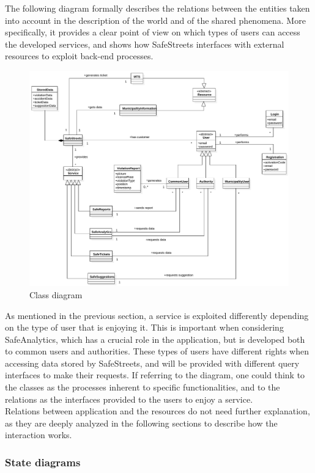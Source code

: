 \documentclass[a4paper]{article}
\begin{document}
The following diagram formally describes the relations between the
entities taken into account in the description of the world and of the
shared phenomena. More specifically, it provides a clear point of view
on which types of users can access the developed services, and shows how
SafeStreets interfaces with external resources to exploit back-end
processes.

\begin{figure}[H]
\centering
\includegraphics[width=\textwidth]{class_diagram}
\caption{Class diagram}
\end{figure}

As mentioned in the previous section, a service is exploited differently
depending on the type of user that is enjoying it. This is important
when considering SafeAnalytics, which has a crucial role in the
application, but is developed both to common users and authorities.
These types of users have different rights when accessing data stored by
SafeStreets, and will be provided with different query interfaces to
make their requests. If referring to the diagram, one could think to the
classes as the processes inherent to specific functionalities, and to
the relations as the interfaces provided to the users to enjoy a
service.\\
Relations between application and the resources do not need further
explanation, as they are deeply analyzed in the following sections to
describe how the interaction works.

\subsubsection{State diagrams}
\end{document}
